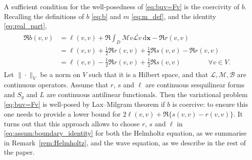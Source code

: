 \documentclass[a4paper]{article}
\theoremstyle{plain}
\theoremstyle{definition}
\newcommand{\conj}[1]{\overline{#1}}
\newcommand{\operator}[1]{\mathcal{#1}}
\newcommand{\dx}{{\,\mathrm{d}\vect x}}
\newcommand{\vect}[1]{\bm{#1}}
\begin{document}
A sufficient condition for  the well-posedness of \eqref{eq:buv=Fv} is the coercivity of $b$.
Recalling the definitions of $b$ \eqref{eq:b} and $m$ \eqref{eq:m_def}, and the identity \eqref{eq:real_part},
\begin{align}\begin{aligned}
		\Re b(v,v) & = \ell(v,v) + \Re \int_D \operator{M}v \conj{\operator{L}v} \dx - \Re r(v,v)               \\
		           & = \ell(v, v) + \frac{1}{2} \Re r(v,v) + \frac{1}{2} \Re s(v,v) - \Re r(v,v)                \\
		           & = \ell(v, v) - \frac{1}{2}\Re r(v,v) + \frac{1}{2} \Re s(v,v) \qquad\qquad \forall v\in V.
	\end{aligned}\label{eq:abstract_coercivity_condition}\end{align}
Let $\|\cdot\|_V$ be a norm on $V$ such that it is a Hilbert space, and that $\operator L,\operator M,\operator B$ are continuous operators.
Assume that $r$, $s$ and $\ell$ are continuous sesquilinear forms and $S_g$ and $L$ are continuous antilinear functionals.
Then the variational problem \eqref{eq:buv=Fv} is well-posed by Lax--Milgram theorem if $b$ is coercive: to ensure this one needs to provide a lower bound for $2 \ell(v,v) + \Re\{s(v,v)-r(v,v)\}$.
It turns out that this approach allows to choose $r$, $s$ and $\ell$ in \eqref{eq:assum:boundary_identity} for both the Helmholtz equation, as we summarise in Remark~\ref{rem:Helmholtz}, and the wave equation, as we describe in the rest of the paper.
\end{document}
